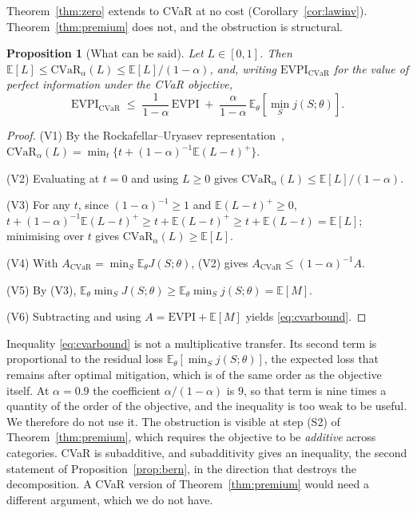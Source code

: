 \documentclass[pdflatex,sn-mathphys-num]{sn-jnl}
\theoremstyle{thmstyleone}
\newtheorem{proposition}[theorem]{Proposition}
\theoremstyle{thmstyletwo}
\theoremstyle{thmstylethree}
\newcommand{\evpi}{\mathrm{EVPI}}
\newcommand{\cvar}{\mathrm{CVaR}}
\begin{document}
Theorem~\ref{thm:zero} extends to CVaR at no cost
(Corollary~\ref{cor:lawinv}). Theorem~\ref{thm:premium} does not, and the
obstruction is structural.

\begin{proposition}[What can be said]\label{prop:cvartransfer}
Let $L\in[0,1]$. Then $\mathbb{E}[L]\le\cvar_\alpha(L)\le
\mathbb{E}[L]/(1-\alpha)$, and, writing $\evpi_{\cvar}$ for the value of
perfect information under the CVaR objective,
\begin{equation}
\evpi_{\cvar}\;\le\;\frac{1}{1-\alpha}\,\evpi
\;+\;\frac{\alpha}{1-\alpha}\,\mathbb{E}_\theta\!\left[\min_S
j(S;\theta)\right].
\label{eq:cvarbound}
\end{equation}
\end{proposition}

\begin{proof}
(V1) By the Rockafellar--Uryasev representation~\cite{rockafellar2000},
$\cvar_\alpha(L)=\min_t\{t+(1-\alpha)^{-1}\mathbb{E}(L-t)^+\}$.

\noindent(V2) Evaluating at $t=0$ and using $L\ge0$ gives
$\cvar_\alpha(L)\le\mathbb{E}[L]/(1-\alpha)$.

\noindent(V3) For any $t$, since $(1-\alpha)^{-1}\ge1$ and
$\mathbb{E}(L-t)^+\ge0$,
$t+(1-\alpha)^{-1}\mathbb{E}(L-t)^+\ge t+\mathbb{E}(L-t)^+
\ge t+\mathbb{E}(L-t)=\mathbb{E}[L]$; minimising over $t$ gives
$\cvar_\alpha(L)\ge\mathbb{E}[L]$.

\noindent(V4) With $A_{\cvar}=\min_S\mathbb{E}_\theta J(S;\theta)$, (V2)
gives $A_{\cvar}\le(1-\alpha)^{-1}A$.

\noindent(V5) By (V3),
$\mathbb{E}_\theta\min_S J(S;\theta)\ge\mathbb{E}_\theta\min_S j(S;\theta)
=\mathbb{E}[M]$.

\noindent(V6) Subtracting and using $A=\evpi+\mathbb{E}[M]$ yields
\eqref{eq:cvarbound}.
\end{proof}

Inequality \eqref{eq:cvarbound} is not a multiplicative transfer. Its second
term is proportional to the residual loss $\mathbb{E}_\theta[\min_S
j(S;\theta)]$, the expected loss that remains after optimal mitigation, which
is of the same order as the objective itself. At $\alpha=0.9$ the coefficient
$\alpha/(1-\alpha)$ is $9$, so that term is nine times a quantity of the order
of the objective, and the inequality is too weak to be useful. We therefore
do not use it. The obstruction is visible at step (S2) of
Theorem~\ref{thm:premium}, which requires the objective to be \emph{additive}
across categories. CVaR is subadditive, and subadditivity gives an
inequality, the second statement of Proposition~\ref{prop:bern}, in the
direction that destroys the decomposition. A CVaR version
of Theorem~\ref{thm:premium} would need a different argument, which we do
not have.
\end{document}
